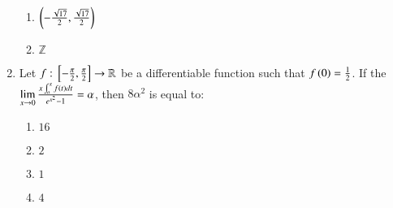 \documentclass[journal]{IEEEtran}
\begin{document}
\begin{enumerate}
\begin{enumerate}
			\item $\left(-\frac{\sqrt{17}}{2}, \frac{\sqrt{17}}{2}\right)$
			\item $\mathbb{Z}$
		\end{enumerate}
	\item Let $f:{}\left[-\frac{\pi}{2}, \frac{\pi}{2}\right] \to \mathbb{R}$ be a differentiable function such that $f\left(0\right)=\frac{1}{2}$. If the $\lim\limits_{x\to0} \frac{x\int_o^xf\left(t\right)dt}{e^{x^2}-1}=\alpha$, then $8\alpha^2$ is equal to:
		\begin{enumerate}
			\item $16$
			\item $2$
			\item $1$
			\item $4$
		\end{enumerate}
\end{enumerate}
\end{document}
